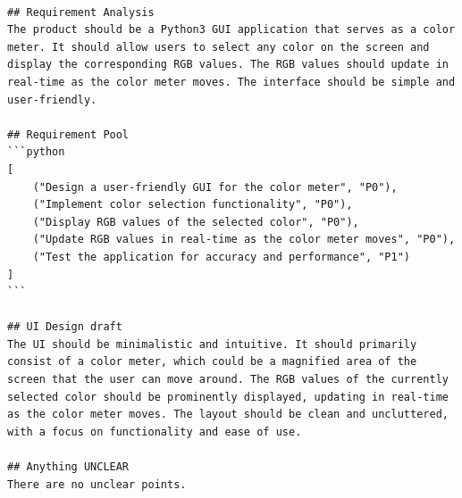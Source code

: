 \begin{tcolorbox}[title={\textbf{\small Product Requirement Document}}, colback=whitesmoke, colframe=royalblue(web), boxrule=2pt, arc=0mm]
{\scriptsize
\begin{lstlisting}[style=mystyle]

## Requirement Analysis
The product should be a Python3 GUI application that serves as a color meter. It should allow users to select any color on the screen and display the corresponding RGB values. The RGB values should update in real-time as the color meter moves. The interface should be simple and user-friendly.

## Requirement Pool
```python
[
    ("Design a user-friendly GUI for the color meter", "P0"),
    ("Implement color selection functionality", "P0"),
    ("Display RGB values of the selected color", "P0"),
    ("Update RGB values in real-time as the color meter moves", "P0"),
    ("Test the application for accuracy and performance", "P1")
]
```

## UI Design draft
The UI should be minimalistic and intuitive. It should primarily consist of a color meter, which could be a magnified area of the screen that the user can move around. The RGB values of the currently selected color should be prominently displayed, updating in real-time as the color meter moves. The layout should be clean and uncluttered, with a focus on functionality and ease of use.

## Anything UNCLEAR
There are no unclear points.
\end{lstlisting}
}
\end{tcolorbox}




